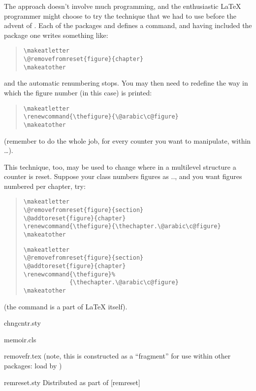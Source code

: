 The  approach doesn't involve much programming, and
the enthusiastic \LaTeX{} programmer might choose to try the technique
that we had to use before the advent of .  Each of
the packages  and  defines a
 command, and having included the package one
writes something like:
\begin{quote}
\begin{verbatim}
\makeatletter
\@removefromreset{figure}{chapter}
\makeatother
\end{verbatim}
\end{quote}
and the automatic renumbering stops.  You may then need to redefine the
way in which the figure number (in this case) is printed:
\begin{quote}
\begin{verbatim}
\makeatletter
\renewcommand{\thefigure}{\@arabic\c@figure}
\makeatother
\end{verbatim}
\end{quote}
(remember to do the whole job, for every counter you want to
manipulate, within  \dots{}\@ {}).

This technique, too, may be used to change where in a multilevel
structure a counter is reset.  Suppose your class numbers figures as
.., and you want figures
numbered per chapter, try:
\begin{quote}
\begin{wideversion}
\begin{verbatim}
\makeatletter
\@removefromreset{figure}{section}
\@addtoreset{figure}{chapter}
\renewcommand{\thefigure}{\thechapter.\@arabic\c@figure}
\makeatother
\end{verbatim}
\end{wideversion}
\begin{narrowversion}
\begin{verbatim}
\makeatletter
\@removefromreset{figure}{section}
\@addtoreset{figure}{chapter}
\renewcommand{\thefigure}%
             {\thechapter.\@arabic\c@figure}
\makeatother
\end{verbatim}
\end{narrowversion}
\end{quote}
(the command  is a part of \LaTeX{} itself).
\begin{ctanrefs}
\item[chngcntr.sty]
\item[memoir.cls]
\item[removefr.tex] (note, this is constructed as a
  ``fragment'' for use within other packages: load by
  )
\item[remreset.sty]Distributed as part of [remreset]
\end{ctanrefs}

